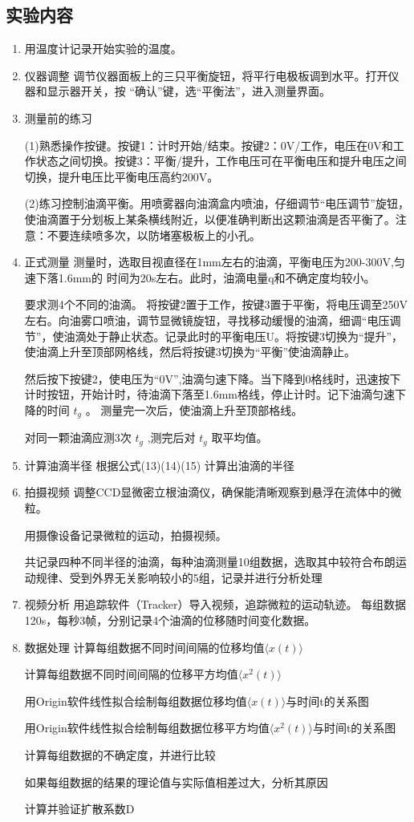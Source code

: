 \documentclass[12pt,a4paper,UTF8]{ctexart}
\begin{document}
\subsection*{实验内容}
\begin{enumerate}
    \item 用温度计记录开始实验的温度。
    \item 仪器调整
	调节仪器面板上的三只平衡旋钮，将平行电极板调到水平。打开仪器和显示器开关，按
“确认”键，选“平衡法”，进入测量界面。

    \item 测量前的练习

(1)熟悉操作按键。按键1：计时开始/结束。按键2：0V/工作，电压在0V和工作状态之间切换。按键3：平衡/提升，工作电压可在平衡电压和提升电压之间切换，提升电压比平衡电压高约200V。

(2)练习控制油滴平衡。用喷雾器向油滴盒内喷油，仔细调节“电压调节”旋钮，使油滴置于分划板上某条横线附近，以便准确判断出这颗油滴是否平衡了。注意：不要连续喷多次，以防堵塞极板上的小孔。
    \item 正式测量
测量时，选取目视直径在1mm左右的油滴，平衡电压为200-300V,匀速下落1.6mm的
时间为20s左右。此时，油滴电量q和不确定度均较小。

要求测4个不同的油滴。
将按键2置于工作，按键3置于平衡，将电压调至250V左右。向油雾口喷油，调节显微镜旋钮，寻找移动缓慢的油滴，细调“电压调节”，使油滴处于静止状态。记录此时的平衡电压U。将按键3切换为“提升”，使油滴上升至顶部网格线，然后将按键3切换为“平衡”使油滴静止。

然后按下按键2，使电压为“0V”,油滴匀速下降。当下降到0格线时，迅速按下计时按钮，开始计时，待油滴下落至1.6mm格线，停止计时。记下油滴匀速下降的时间 $t_g$ 。
测量完一次后，使油滴上升至顶部格线。

对同一颗油滴应测3次 $t_g$ ,测完后对 $t_g$ 取平均值。

	\item 计算油滴半径
根据公式(13)(14)(15)
计算出油滴的半径

	\item 拍摄视频
	调整CCD显微密立根油滴仪，确保能清晰观察到悬浮在流体中的微粒。

	用摄像设备记录微粒的运动，拍摄视频。

	共记录四种不同半径的油滴，每种油滴测量10组数据，选取其中较符合布朗运动规律、受到外界无关影响较小的5组，记录并进行分析处理
	\item 视频分析
	用追踪软件（Tracker）导入视频，追踪微粒的运动轨迹。
	每组数据120s，每秒3帧，分别记录4个油滴的位移随时间变化数据。
	
	\item 数据处理
计算每组数据不同时间间隔的位移均值$\langle x(t)\rangle$

计算每组数据不同时间间隔的位移平方均值$\langle x^2(t)\rangle$

用Origin软件线性拟合绘制每组数据位移均值$\langle x(t)\rangle$与时间t的关系图

用Origin软件线性拟合绘制每组数据位移平方均值$\langle x^2(t)\rangle$与时间t的关系图

计算每组数据的不确定度，并进行比较

如果每组数据的结果的理论值与实际值相差过大，分析其原因

计算并验证扩散系数D
\end{enumerate}
\end{document}

